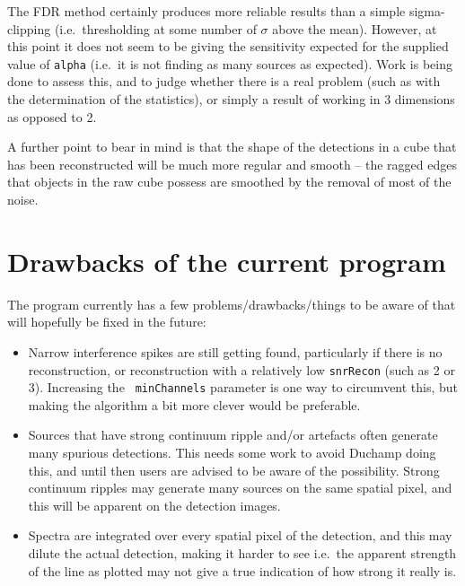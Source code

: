 \documentclass[12pt]{article}
\newcommand{\ie}{i.e.\ }
\begin{document}
The FDR method certainly produces more reliable results than a simple
sigma-clipping (\ie thresholding at some number of $\sigma$ above the
mean). However, at this point it does not seem to be giving the
sensitivity expected for the supplied value of {\tt alpha} (\ie it is
not finding as many sources as expected). Work is
being done to assess this, and to judge whether there is a real
problem (such as with the determination of the statistics), or simply
a result of working in 3 dimensions as opposed to 2.

A further point to bear in mind is that the shape of the detections in
a cube that has been reconstructed will be much more regular and
smooth -- the ragged edges that objects in the raw cube possess are
smoothed by the removal of most of the noise.

\section{Drawbacks of the current program}

The program currently has a few problems/drawbacks/things to be aware
of that will hopefully be fixed in the future:
\begin{itemize}

\item Narrow interference spikes are still getting found, particularly
  if there is no reconstruction, or reconstruction with a relatively
  low {\tt snrRecon} (such as 2 or 3). Increasing the {\tt
  minChannels} parameter is one way to circumvent this, but making the
  algorithm a bit more clever would be preferable.

\item Sources that have strong continuum ripple and/or artefacts often
  generate many spurious detections. This needs some work to avoid
  Duchamp doing this, and until then users are advised to be aware
  of the possibility. Strong continuum ripples may generate many
  sources on the same spatial pixel, and this will be apparent on the
  detection images.

\item Spectra are integrated over every spatial pixel of the
  detection, and this may dilute the actual detection, making it
  harder to see \ie the apparent strength of the line as plotted may
  not give a true indication of how strong it really is.



\end{itemize}
\end{document}

